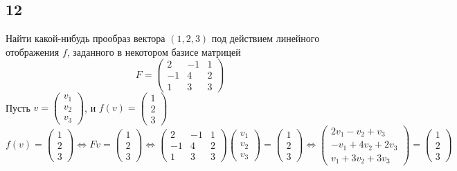 \subsection{12}

Найти какой-нибудь прообраз вектора $ (1, 2, 3) $ под действием линейного отображения $ f $, заданного в некотором базисе матрицей
$$ F =
\begin{pmatrix}
	2 & -1 & 1 \\
    -1 & 4 & 2 \\
    1 & 3 & 3
\end{pmatrix} $$
Пусть $ v =
\begin{pmatrix}
	v_1 \\
    v_2 \\
    v_3
\end{pmatrix} $, и $ f(v) =
\begin{pmatrix}
	1 \\
    2 \\
    3
\end{pmatrix} $
$$ f(v) =
\begin{pmatrix}
	1 \\
    2 \\
    3
\end{pmatrix} \iff Fv =
\begin{pmatrix}
	1 \\
    2 \\
    3
\end{pmatrix} \iff
\begin{pmatrix}
	2 & -1 & 1 \\
    -1 & 4 & 2 \\
    1 & 3 & 3
\end{pmatrix}
\begin{pmatrix}
	v_1 \\
    v_2 \\
    v_3
\end{pmatrix} =
\begin{pmatrix}
	1 \\
    2 \\
    3
\end{pmatrix} \iff
\begin{pmatrix}
	2v_1 - v_2 + v_3 \\
    -v_1 + 4v_2 + 2v_3 \\
    v_1 + 3v_2 + 3v_3
\end{pmatrix} =
\begin{pmatrix}
	1 \\
    2 \\
    3
\end{pmatrix} $$
